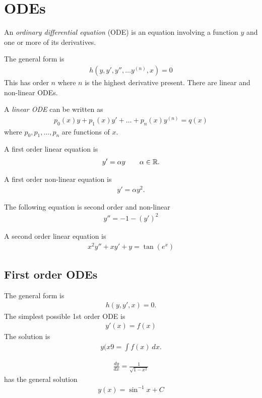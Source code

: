 \section{ODEs}

\begin{df}
	An \emph{ordinary differential equation} (ODE) is an equation involving a function $y$ and one or more of its derivatives.
\end{df}

The general form is
\begin{align*}
h(y,y',y'', \dots y^{(n)}, x) = 0
\end{align*}
This has order $n$ where $n$ is the highest derivative present. There are linear and non-linear ODEs.

\begin{df}
	A \emph{linear ODE} can be written as
	\begin{align*}
	p_0(x) y + p_1(x) y' + \dots + p_n(x) y^{(n)} = q(x)
	\end{align*}
	where $p_0, p_1, \dots, p_n$ are functions of $x$.
\end{df}

\begin{nex}
	\item
	A first order linear equation is
	\begin{align*}
	y' = \alpha y \qquad \alpha \in \mathbb R.
	\end{align*}
	\item
	A first order non-linear equation is
	\begin{align*}
	y' = \alpha y^2.
	\end{align*}
	\item
	The following equation is second order and non-linear
	\begin{align*}
	y'' = -1 -(y')^2
	\end{align*}
	\item
	A second order linear equation is
	\begin{align*}
	x^2 y'' + xy' + y = \tan(e^x)
	\end{align*}
\end{nex}



\subsection{First order ODEs}
The general form is 
\begin{align*}
h(y,y',x) = 0.
\end{align*}
The simplest possible 1st order ODE is
\begin{align*}
y'(x) = f(x)
\end{align*}
The solution is
\begin{align*}
y(x9 = \int f(x) ~dx.
\end{align*}
\begin{ex}
	\begin{align*}
	\frac{dy}{dx} = \frac 1 {\sqrt{1-x^2}}
	\end{align*}
	has the general solution 
	\begin{align*}
	y(x) = \sin^{-1} x + C
	\end{align*}
\end{ex}

